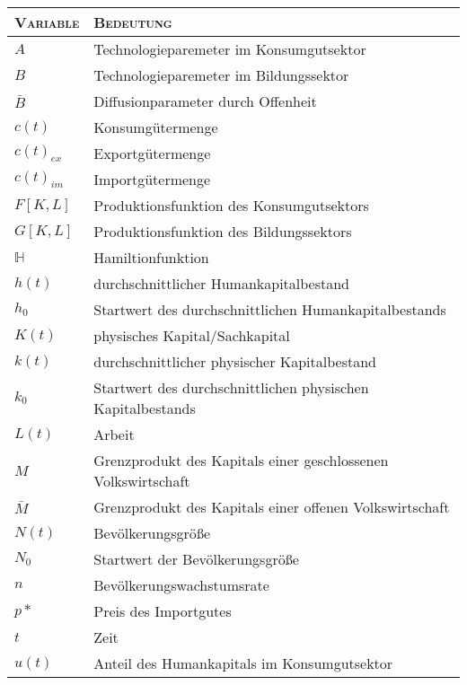 \begin{longtable}{l|l} %
	
	\textsc{Variable} & \textsc{Bedeutung}\\
	\hline
	\endhead
	
	\endfoot
	
		$A$ & Technologieparemeter im Konsumgutsektor\\%
		$B$ & Technologieparemeter im Bildungssektor\\%
		$\bar{B}$ & Diffusionparameter durch Offenheit\\%
		$c(t)$ & Konsumgütermenge\\%
		$c(t)_{ex}$ & Exportgütermenge\\%
		$c(t)_{im}$ & Importgütermenge\\%
		$F[K,L]$ & Produktionsfunktion des Konsumgutsektors\\%
		$G[K,L]$ & Produktionsfunktion des Bildungssektors\\%
		$\mathbb{H}$ & Hamiltionfunktion\\%
		$h(t)$ & durchschnittlicher Humankapitalbestand\\%
		$h_{0}$ & Startwert des durchschnittlichen Humankapitalbestands\\%
		$K(t)$ & physisches Kapital/Sachkapital\\ %
		$k(t)$ & durchschnittlicher physischer Kapitalbestand\\%
		$k_{0}$ & Startwert des durchschnittlichen physischen Kapitalbestands\\%
		$L(t)$ & Arbeit\\%
		$M$ & Grenzprodukt des Kapitals einer geschlossenen Volkswirtschaft\\
	  $\bar{M}$ & Grenzprodukt des Kapitals einer offenen Volkswirtschaft\\%
		$N(t)$ & Bevölkerungsgrö{\ss}e\\%
		$N_0$ & Startwert der Bevölkerungsgrö{\ss}e\\
		$n$ & Bevölkerungswachstumsrate\\%
		$p*$ & Preis des Importgutes\\%
		$t$ & Zeit\\%
		$u(t)$ & Anteil des Humankapitals im Konsumgutsektor\\%

\end{longtable}
